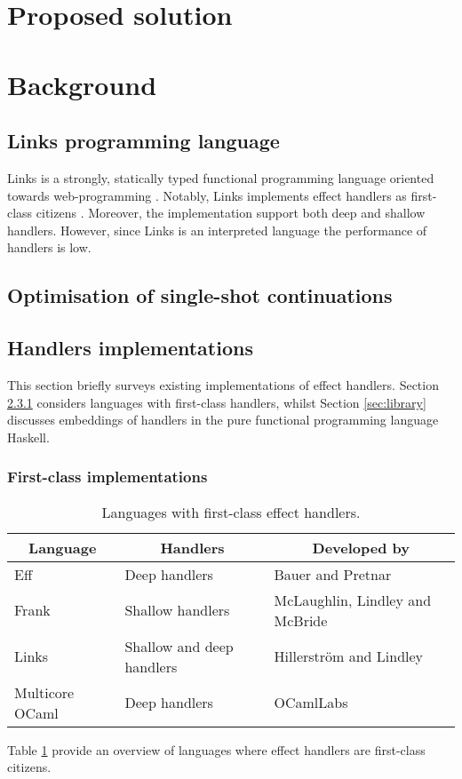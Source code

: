 \documentclass[a4paper,11pt,twoside]{article}
\begin{document}
  \section{Proposed solution}

  \section{Background}
  \subsection{Links programming language}
  Links is a strongly, statically typed functional programming language oriented towards web-programming \cite{Cooper2006}. Notably, Links implements effect handlers as first-class citizens \cite{Hillerstrom2015}. Moreover, the implementation support both deep and shallow handlers. However, since Links is an interpreted language the performance of handlers is low.

  \subsection{Optimisation of single-shot continuations}

  \subsection{Handlers implementations}
  This section briefly surveys existing implementations of effect handlers. Section \ref{sec:first-class} considers languages with first-class handlers, whilst Section \ref{sec:library} discusses embeddings of handlers in the pure functional programming language Haskell.
  \subsubsection{First-class implementations}\label{sec:first-class}
  \begin{table}[H]
    \centering 
    \begin{tabular}{| l | l | l |}
      \hline
      \multicolumn{1}{|c|}{Language} & \multicolumn{1}{c|}{Handlers} & \multicolumn{1}{c|}{Developed by} \\
      \hline
      Eff & Deep handlers & Bauer and Pretnar \\ 
      \hline
      Frank & Shallow handlers & McLaughlin, Lindley and McBride \\    
      \hline
      Links & Shallow and deep handlers & Hillerström and Lindley\\
      \hline
      Multicore OCaml & Deep handlers & OCamlLabs \\
      \hline    
    \end{tabular}\caption{Languages with first-class effect handlers.}\label{tbl:impls}
  \end{table}
  Table \ref{tbl:impls} provide an overview of languages where effect handlers are first-class citizens. 
\end{document}
